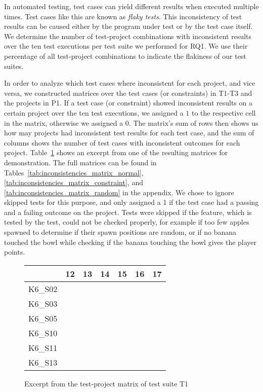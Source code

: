 \noindent In automated testing, test cases can yield different results when executed multiple times.
Test cases like this are known as \textit{flaky tests}.
This inconsistency of test results can be caused either by the program under test or by the test case itself.
We determine the number of test-project combinations with inconsistent results over the ten test executions per test suite we performed for RQ1.
We use their percentage of all test-project combinations to indicate the flakiness of our test suites.
\parspace

In order to analyze which test cases where inconsistent for each project, and vice versa,
we constructed matrices over the test cases (or constraints) in T1-T3 and the projects in P1.
If a test case (or constraint) showed inconsistent results on a certain project over the ten test executions,
we assigned a $1$ to the respective cell in the matrix, otherwise we assigned a 0.
The matrix's sum of rows then shows us how may projects had inconsistent test results for each test case,
and the sum of columns shows the number of test cases with inconsistent outcomes for each project.
Table~\ref{tab:inconsistency_matrices_excerpt} shows an excerpt from one of the resulting matrices for demonstration.
The full matrices can be found in Tables~\ref{tab:inconsistencies_matrix_normal}, \ref{tab:inconsistencies_matrix_constraint}, and \ref{tab:inconsistencies_matrix_random} in the appendix.
We chose to ignore skipped tests for this purpose,
and only assigned a 1 if the test case had a passing and a failing outcome on the project.
Tests were skipped if the feature, which is tested by the test, could not be checked properly,
for example if too few apples spawned to determine if their spawn positions are random,
or if no banana touched the bowl while checking if the banana touching the bowl gives the player points.
\parspace

\begin{figure}[htpb]
    \centering

    \setlength{\tabcolsep}{0.2em}
    \tiny
    \begin{tabular}{l|rrrrrr}
        \toprule
                & 12 & 13 & 14 & 15 & 16 & 17 \\
        \midrule
        K6\_S02 & \n & \e & \n & \n & \n & \n \\
        K6\_S03 & \n & \e & \n & \n & \n & \n \\
        K6\_S05 & \n & \n & \n & \n & \n & \n \\
        K6\_S10 & \n & \e & \e & \n & \n & \n \\
        K6\_S11 & \n & \n & \n & \n & \n & \n \\
        K6\_S13 & \n & \n & \n & \n & \n & \n \\
        \bottomrule
    \end{tabular}
    \setlength{\tabcolsep}{\defaulttabcolsep}

    \caption{Excerpt from the test-project matrix of test suite T1}
    \label{tab:inconsistency_matrices_excerpt}
\end{figure}

